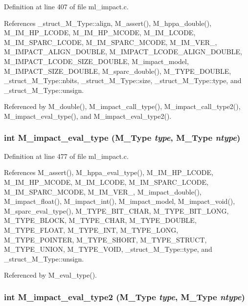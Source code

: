 Definition at line 407 of file ml\_\-impact.c.

References \_\-struct\_\-M\_\-Type::align, M\_\-assert(), M\_\-hppa\_\-double(), M\_\-IM\_\-HP\_\-LCODE, M\_\-IM\_\-HP\_\-MCODE, M\_\-IM\_\-LCODE, M\_\-IM\_\-SPARC\_\-LCODE, M\_\-IM\_\-SPARC\_\-MCODE, M\_\-IM\_\-VER\_, M\_\-IMPACT\_\-ALIGN\_\-DOUBLE, M\_\-IMPACT\_\-LCODE\_\-ALIGN\_\-DOUBLE, M\_\-IMPACT\_\-LCODE\_\-SIZE\_\-DOUBLE, M\_\-impact\_\-model, M\_\-IMPACT\_\-SIZE\_\-DOUBLE, M\_\-sparc\_\-double(), M\_\-TYPE\_\-DOUBLE, \_\-struct\_\-M\_\-Type::nbits, \_\-struct\_\-M\_\-Type::size, \_\-struct\_\-M\_\-Type::type, and \_\-struct\_\-M\_\-Type::unsign.

Referenced by M\_\-double(), M\_\-impact\_\-call\_\-type(), M\_\-impact\_\-call\_\-type2(), M\_\-impact\_\-eval\_\-type(), and M\_\-impact\_\-eval\_\-type2().
\subsubsection{\setlength{\rightskip}{0pt plus 5cm}int M\_\-impact\_\-eval\_\-type (\bf{M\_\-Type} {\em type}, \bf{M\_\-Type} {\em ntype})}\label{ml__impact_8c_a1a04fd589ebbb42a94d90e64e0eb165}




Definition at line 477 of file ml\_\-impact.c.

References M\_\-assert(), M\_\-hppa\_\-eval\_\-type(), M\_\-IM\_\-HP\_\-LCODE, M\_\-IM\_\-HP\_\-MCODE, M\_\-IM\_\-LCODE, M\_\-IM\_\-SPARC\_\-LCODE, M\_\-IM\_\-SPARC\_\-MCODE, M\_\-IM\_\-VER\_, M\_\-impact\_\-double(), M\_\-impact\_\-float(), M\_\-impact\_\-int(), M\_\-impact\_\-model, M\_\-impact\_\-void(), M\_\-sparc\_\-eval\_\-type(), M\_\-TYPE\_\-BIT\_\-CHAR, M\_\-TYPE\_\-BIT\_\-LONG, M\_\-TYPE\_\-BLOCK, M\_\-TYPE\_\-CHAR, M\_\-TYPE\_\-DOUBLE, M\_\-TYPE\_\-FLOAT, M\_\-TYPE\_\-INT, M\_\-TYPE\_\-LONG, M\_\-TYPE\_\-POINTER, M\_\-TYPE\_\-SHORT, M\_\-TYPE\_\-STRUCT, M\_\-TYPE\_\-UNION, M\_\-TYPE\_\-VOID, \_\-struct\_\-M\_\-Type::type, and \_\-struct\_\-M\_\-Type::unsign.

Referenced by M\_\-eval\_\-type().
\subsubsection{\setlength{\rightskip}{0pt plus 5cm}int M\_\-impact\_\-eval\_\-type2 (\bf{M\_\-Type} {\em type}, \bf{M\_\-Type} {\em ntype})}\label{ml__impact_8c_a005d77e1253669ccb2887ecee53ec79}




